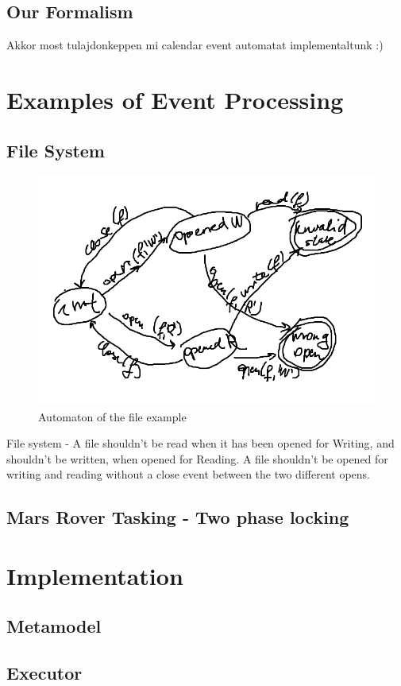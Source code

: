 	\subsection{Our Formalism}
		Akkor most tulajdonkeppen mi calendar event automatat implementaltunk :) 
\section{Examples of Event Processing}

	\subsection{File System}
	
	\begin{figure}[h]
	\centering
	\includegraphics[width=0.5\linewidth]{include/figures/chapter_5/fileautomaton}
	\caption{Automaton of the file example}
	\label{fig:cep:fileautomaton}
	\end{figure}

	File system - A file shouldn't be read when it has been opened for Writing, and shouldn't be written, when opened for Reading. 
	A file shouldn't be opened for writing and reading without a close event between the two different opens.
	
	
	\subsection{Mars Rover Tasking - Two phase locking}

\section{Implementation}
	\subsection{Metamodel}
	\subsection{Executor}
